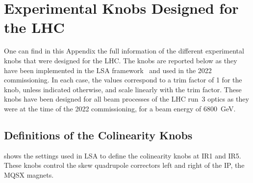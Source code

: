 \chapter{Experimental Knobs Designed for the LHC}
\label{appendix:experimental_knobs}

One can find in this Appendix the full information of the different experimental \glspl{knob} that were designed for the \acrshort{LHC}.
The knobs are reported below as they have been implemented in the \gls{LSA} framework~\cite{ICALEPS:Jacquet:LHC_Software_Architecture} and used in the \num{2022} commissioning.
In each case, the values correspond to a \gls{trim} factor of \num{1} for the knob, unless indicated otherwise, and scale linearly with the trim factor.
These knobs have been designed for all beam processes of the LHC \Gls{run}~\num{3} optics as they were at the time of the \num{2022} commissioning, for a beam energy of \qty{6800}{\giga\electronvolt}.


\section{Definitions of the Colinearity Knobs}
\label{section:colinearity_knobs_lsa}

 shows the settings used in \gls{LSA} to define the colinearity knobs at IR\num{1} and IR\num{5}.
These knobs control the \gls{skew} quadrupole correctors left and right of the \gls{IP}, the MQSX magnets.

